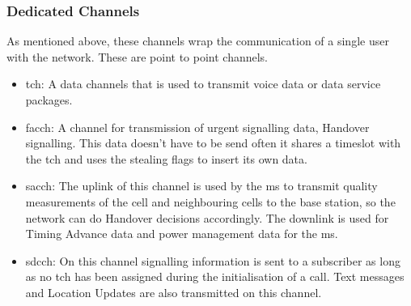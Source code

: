 \subsubsection{Dedicated Channels}
As mentioned above, these channels wrap the communication of a single user with the network.
These are point to point channels.
\begin{itemize}
	\item \gls{tch}: A data channels that is used to transmit voice data or data service packages.
	\item \gls{facch}: A channel for transmission of urgent signalling data, \eg Handover signalling.
	This data doesn't have to be send often it shares a timeslot with the \gls{tch} and uses the stealing flags to insert its own data.
	\item \gls{sacch}: The uplink of this channel is used by the \gls{ms} to transmit quality measurements of the cell and neighbouring cells to the base station, so the network can do Handover decisions accordingly.
	The downlink is used for Timing Advance data and power management data for the \gls{ms}.
	\item \gls{sdcch}: On this channel signalling information is sent to a subscriber as long as no \gls{tch} has been assigned during the initialisation of a call.
	Text messages and Location Updates are also transmitted on this channel.
\end{itemize}

